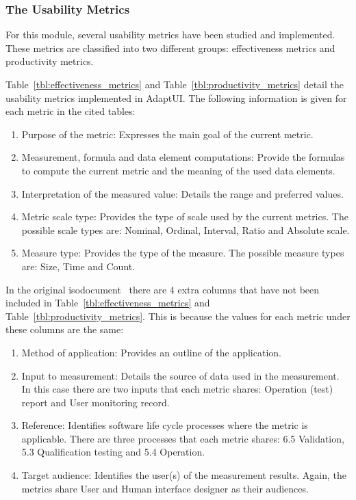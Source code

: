 

\subsubsection{The Usability Metrics}
\label{sec:usability_metrics}
For this module, several usability metrics have been studied and implemented.
These metrics are classified into two different groups: effectiveness metrics
and productivity metrics.

Table~\ref{tbl:effectiveness_metrics} and Table~\ref{tbl:productivity_metrics}
detail the usability metrics implemented in AdaptUI. The following information
is given for each metric in the cited tables:

\begin{enumerate}[label=\alph*)]
  \item Purpose of the metric: Expresses the main goal of the current metric.
  \item Measurement, formula and data element computations: Provide the formulas
  to compute the current metric and the meaning of the used data elements.
  \item Interpretation of the measured value: Details the range and preferred values.
  \item Metric scale type: Provides the type of scale used by the current metrics.
  The possible scale types are: Nominal, Ordinal, Interval, Ratio and Absolute
  scale.
  \item Measure type: Provides the type of the measure. The possible measure
  types are: Size, Time and Count.
\end{enumerate}

In the original \ac{iso}document~\citep{ISOIEC9126} there are 4 extra columns that
have not been included in Table~\ref{tbl:effectiveness_metrics} and
Table~\ref{tbl:productivity_metrics}. This is because the values for each metric
under these columns are the same:

\begin{enumerate}[label=\alph*)]
  \item Method of application: Provides an outline of the application. 
  
  \item Input to measurement: Details the source of data used in the measurement.
  In this case there are two inputs that each metric shares: Operation (test) 
  report and User monitoring record.
  
  \item Reference: Identifies software life cycle processes where the metric is
  applicable. There are three processes that each metric shares: 6.5 Validation,
  5.3 Qualification testing and 5.4 Operation.
  
  \item Target audience: Identifies the user(s) of the measurement results. Again,
  the metrics share User and Human interface designer as their audiences.
\end{enumerate}


